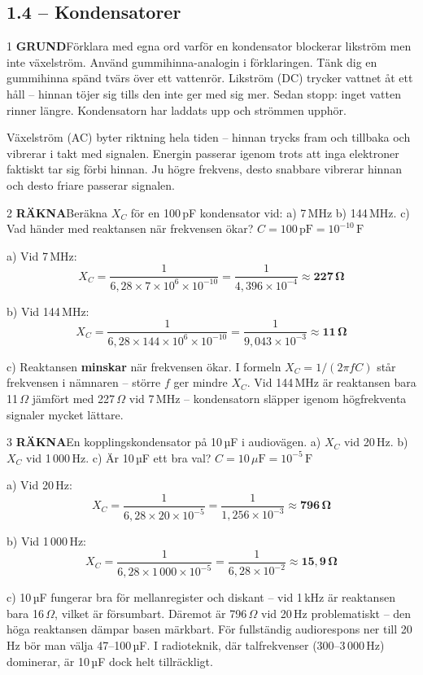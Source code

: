 \documentclass[a4paper,11pt,twoside]{book}
\newcommand{\qgrund}{\colorbox{greenpale}{\textcolor{greendark}{\headingfont\bfseries\tiny GRUND}}}
\newcommand{\qrakna}{\colorbox{bluepale}{\textcolor{bluedark}{\headingfont\bfseries\tiny RÄKNA}}}
\begin{document}
\subsection*{1.4 -- Kondensatorer}

\begin{facitblock}{1}
\qgrund\quad Förklara med egna ord varför en kondensator blockerar likström men inte växelström. Använd gummihinna-analogin i förklaringen.
\tcblower
Tänk dig en gummihinna spänd tvärs över ett vattenrör. Likström (DC) trycker vattnet åt ett håll -- hinnan töjer sig tills den inte ger med sig mer. Sedan stopp: inget vatten rinner längre. Kondensatorn har laddats upp och strömmen upphör.

Växelström (AC) byter riktning hela tiden -- hinnan trycks fram och tillbaka och vibrerar i takt med signalen. Energin passerar igenom trots att inga elektroner faktiskt tar sig förbi hinnan. Ju högre frekvens, desto snabbare vibrerar hinnan och desto friare passerar signalen.
\end{facitblock}

\begin{facitblock}{2}
\qrakna\quad Beräkna $X_C$ för en 100\,pF kondensator vid: a) 7\,MHz \quad b) 144\,MHz. \quad c) Vad händer med reaktansen när frekvensen ökar?
\tcblower
$C = 100\,\text{pF} = 10^{-10}\,\text{F}$

a) Vid 7\,MHz:
\[ X_C = \frac{1}{6{,}28 \times 7 \times 10^6 \times 10^{-10}} = \frac{1}{4{,}396 \times 10^{-4}} \approx \mathbf{227\,\Omega} \]

b) Vid 144\,MHz:
\[ X_C = \frac{1}{6{,}28 \times 144 \times 10^6 \times 10^{-10}} = \frac{1}{9{,}043 \times 10^{-3}} \approx \mathbf{11\,\Omega} \]

c) Reaktansen \textbf{minskar} när frekvensen ökar. I formeln $X_C = 1/(2\pi fC)$ står frekvensen i nämnaren -- större $f$ ger mindre $X_C$. Vid 144\,MHz är reaktansen bara 11\,$\Omega$ jämfört med 227\,$\Omega$ vid 7\,MHz -- kondensatorn släpper igenom högfrekventa signaler mycket lättare.
\end{facitblock}

\begin{facitblock}{3}
\qrakna\quad En kopplingskondensator på 10\,µF i audiovägen. a) $X_C$ vid 20\,Hz. b) $X_C$ vid 1\,000\,Hz. c) Är 10\,µF ett bra val?
\tcblower
$C = 10\,\mu\text{F} = 10^{-5}\,\text{F}$

a) Vid 20\,Hz:
\[ X_C = \frac{1}{6{,}28 \times 20 \times 10^{-5}} = \frac{1}{1{,}256 \times 10^{-3}} \approx \mathbf{796\,\Omega} \]

b) Vid 1\,000\,Hz:
\[ X_C = \frac{1}{6{,}28 \times 1\,000 \times 10^{-5}} = \frac{1}{6{,}28 \times 10^{-2}} \approx \mathbf{15{,}9\,\Omega} \]

c) 10\,µF fungerar bra för mellanregister och diskant -- vid 1\,kHz är reaktansen bara 16\,$\Omega$, vilket är försumbart. Däremot är 796\,$\Omega$ vid 20\,Hz problematiskt -- den höga reaktansen dämpar basen märkbart. För fullständig audiorespons ner till 20\,Hz bör man välja 47--100\,µF. I radioteknik, där talfrekvenser (300--3\,000\,Hz) dominerar, är 10\,µF dock helt tillräckligt.
\end{facitblock}
\end{document}
